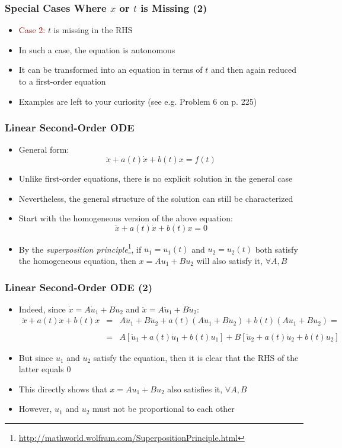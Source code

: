 \documentclass[10pt,usenames,dvipsnames]{beamer}
\theoremstyle{definition}
\begin{document}
\begin{frame}[fragile]
\frametitle{Special Cases Where $x$ or $t$ is Missing (2)}
\begin{itemize}
	\item \textcolor{darkred}{Case 2:} $t$ is missing in the RHS
	\item In such a case, the equation is autonomous
	\item It can be transformed into an equation in terms of $t$ and then again reduced to a first-order equation
	\item Examples are left to your curiosity (see e.g. Problem 6 on p. 225)
\end{itemize}
\end{frame}

\begin{frame}[fragile]
\frametitle{Linear Second-Order ODE}
\begin{itemize}
	\item General form:
	\[
		\ddot{x} + a(t)\dot{x} + b(t)x = f(t)
	\]
	\item Unlike first-order equations, there is no explicit solution in the general case
	\item Nevertheless, the general structure of the solution can still be characterized
	\item Start with the homogeneous version of the above equation:
	\[
		\ddot{x} + a(t)\dot{x} + b(t)x = 0
	\]
	\item By the \textit{superposition principle}\footnote{\url{http://mathworld.wolfram.com/SuperpositionPrinciple.html}}, if $u_{1} = u_{1}(t)$ and $u_{2} = u_{2}(t)$ both satisfy the homogeneous equation, then $x = Au_{1} + Bu_{2}$ will also satisfy it, $\forall A,B$
\end{itemize}
\end{frame}

\begin{frame}[fragile]
\frametitle{Linear Second-Order ODE (2)}
\begin{itemize}
	\item Indeed, since $\dot{x} = A\dot{u}_{1} + B\dot{u}_{2}$ and $\ddot{x} = A\ddot{u}_{1} + B\ddot{u}_{2}$:
	\[
		\begin{array}{lcl}
			\ddot{x} + a(t)\dot{x} + b(t)x & = & A\ddot{u}_{1} + B\ddot{u}_{2} + a(t)(A\dot{u}_{1} + B\dot{u}_{2}) + b(t)(Au_{1} + Bu_{2}) = \\
			\quad\\
			& = & A[\ddot{u}_{1} + a(t)\dot{u}_{1} + b(t)u_{1}] + B[\ddot{u}_{2} + a(t)\dot{u}_{2} + b(t)u_{2}]
		\end{array}
	\]
	\item But since $u_{1}$ and $u_{2}$ satisfy the equation, then it is clear that the RHS of the latter equals 0
	\item This directly shows that $x = Au_{1} + Bu_{2}$ also satisfies it, $\forall A,B$
	\item However, $u_{1}$ and $u_{2}$ must not be proportional to each other
\end{itemize}
\end{frame}
\end{document}
